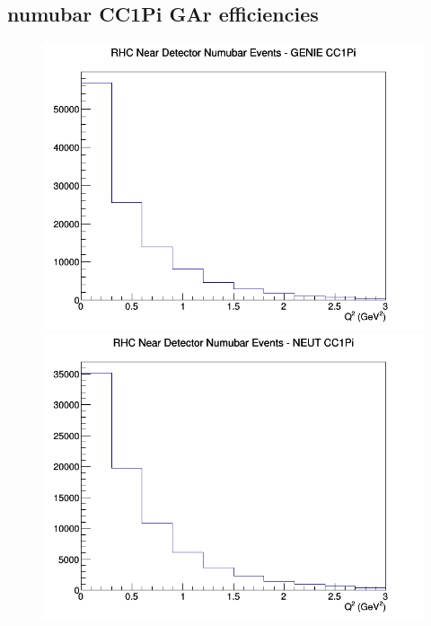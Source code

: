 \documentclass[12pt]{article}
\begin{document}
\subsection{numubar CC1Pi GAr efficiencies}
\begin{figure}[h]
\includegraphics[width=\linewidth]{eff_Q2/GAr/CC1Pi_RHC_ND_numubar_Q2_GENIE.png}
\endminipage
{}
\includegraphics[width=\linewidth]{eff_Q2/GAr/CC1Pi_RHC_ND_numubar_Q2_NEUT.png}
\endminipage
{}

\end{figure}
\end{document}
